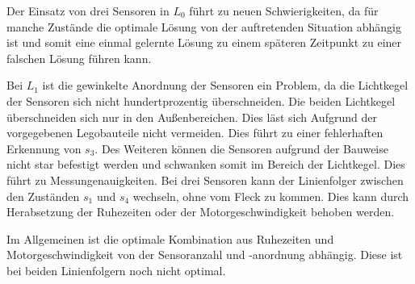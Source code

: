 Der Einsatz von drei Sensoren in $L_0$ führt zu neuen Schwierigkeiten, da für manche Zustände die optimale Lösung von der auftretenden Situation abhängig ist und somit eine einmal gelernte Lösung zu einem späteren Zeitpunkt zu einer falschen Lösung führen kann.\par
Bei $L_1$ ist die gewinkelte Anordnung der Sensoren ein Problem, da die Lichtkegel der Sensoren sich nicht hundertprozentig überschneiden. Die beiden Lichtkegel überschneiden sich nur in den Außenbereichen. Dies läst sich Aufgrund der vor\-ge\-ge\-benen Legobauteile nicht vermeiden. Dies führt zu einer fehlerhaften Erkennung von $s_3$. Des Weiteren können die Sensoren aufgrund der Bauweise nicht star befestigt werden und schwanken somit im Bereich der Lichtkegel. Dies führt zu Messungenauigkeiten. Bei drei Sensoren kann der Linienfolger zwischen den Zuständen $s_1$ und $s_4$ wechseln, ohne vom Fleck zu kommen. Dies kann durch Herabsetzung der Ruhezeiten oder der Motorgeschwindigkeit behoben werden.\par
Im Allgemeinen ist die optimale Kombination aus Ruhezeiten und Motorgeschwindigkeit von der Sensoranzahl und -anordnung abhängig. Diese ist bei beiden Linienfolgern noch nicht optimal. 


